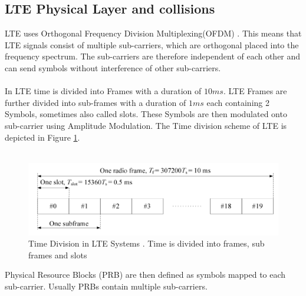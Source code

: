 \documentclass[conference]{IEEEtran}
\begin{document}
\subsection{LTE Physical Layer and collisions} \label{collision}
LTE uses Orthogonal Frequency Division Multiplexing(OFDM) \cite{ETSI_TS_138_211}.
This means that LTE signals consist of multiple sub-carriers, which are orthogonal placed into the frequency spectrum.
The sub-carriers are therefore independent of each other and can send symbols without interference of other sub-carriers.\\\\
In LTE time is divided into Frames with a duration of $10 ms$.
LTE Frames are further divided into sub-frames with a duration of $1 ms$ each containing 2 Symbols, sometimes also called slots. These Symbols are then modulated onto sub-carrier using Amplitude Modulation. The Time division scheme of LTE is depicted in Figure \ref{fig:time}.\\\\
\begin{figure}
    \centering
    \includegraphics[width= \columnwidth]{Figures/LTE_Frame2.png}
    \caption{Time Division in LTE Systems \cite{ETSI_TS_138_211}. Time is divided into frames, sub frames and slots}
    \label{fig:time}
\end{figure}
Physical Resource Blocks (PRB) are then defined as symbols mapped to each sub-carrier. Usually PRBs contain multiple sub-carriers.
\end{document}
